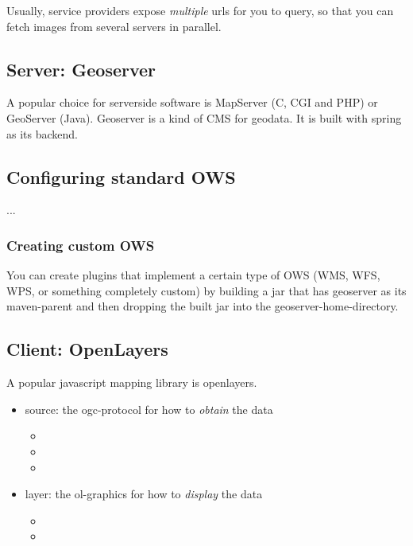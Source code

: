 Usually, service providers expose \emph{multiple} urls for you to query, so that you can fetch images from several servers in parallel. 


\subsection{Server: Geoserver}
A popular choice for serverside software is MapServer (C, CGI and PHP) or GeoServer (Java). Geoserver is a kind of CMS for geodata. It is built with spring as its backend. 

\subsection{Configuring standard OWS}
...

\subsubsection{Creating custom OWS}
You can create plugins that implement a certain type of OWS (WMS, WFS, WPS, or something completely custom) by building a jar that has geoserver as its maven-parent and then dropping the built jar into the geoserver-home-directory.



\subsection{Client: OpenLayers}

A popular javascript mapping library is openlayers. 

\begin{itemize}
    \item source: the ogc-protocol for how to \emph{obtain} the data
        \begin{itemize}
            \item {}
            \item {}
            \item {}
        \end{itemize}
    \item layer: the ol-graphics for how to \emph{display} the data
        \begin{itemize}
            \item {}
            \item {}
        \end{itemize}
\end{itemize}





